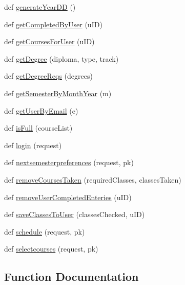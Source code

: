 \begin{DoxyCompactItemize}
def \mbox{\hyperlink{namespacelanding_1_1views_a07d432deb07b33da6ab263caafabb819}{generate\+Year\+DD}} ()
\item 
def \mbox{\hyperlink{namespacelanding_1_1views_ab8699575ba0ef576f40bd71e73a8530f}{get\+Completed\+By\+User}} (u\+ID)
\item 
def \mbox{\hyperlink{namespacelanding_1_1views_a35d744b4e891af5594e09cc3d0ed42bf}{get\+Courses\+For\+User}} (u\+ID)
\item 
def \mbox{\hyperlink{namespacelanding_1_1views_a58f59d9cfdce67b9f2c7f59d99e39e4e}{get\+Degree}} (diploma, type, track)
\item 
def \mbox{\hyperlink{namespacelanding_1_1views_adf4b5d99c41ac39f87a359bdd86b2b02}{get\+Degree\+Reqs}} (degrees)
\item 
def \mbox{\hyperlink{namespacelanding_1_1views_a205b22bd62d9457694957d93b53f35af}{get\+Semester\+By\+Month\+Year}} (m)
\item 
def \mbox{\hyperlink{namespacelanding_1_1views_a8d5dc6aa494a2a455d00898fe7c1a994}{get\+User\+By\+Email}} (e)
\item 
def \mbox{\hyperlink{namespacelanding_1_1views_a0c2f89f5183919eb35499eea63f159a1}{is\+Full}} (course\+List)
\item 
def \mbox{\hyperlink{namespacelanding_1_1views_a7b08070340297551acfaafde9d9376bb}{login}} (request)
\item 
def \mbox{\hyperlink{namespacelanding_1_1views_ae0ecf1d0ea604a47a4617911d02051aa}{nextsemesterpreferences}} (request, pk)
\item 
def \mbox{\hyperlink{namespacelanding_1_1views_a0c09aa6ffb498dba6bae2f61fac3a37d}{remove\+Courses\+Taken}} (required\+Classes, classes\+Taken)
\item 
def \mbox{\hyperlink{namespacelanding_1_1views_a15788f148f992f964f914e41cca3563a}{remove\+User\+Completed\+Enteries}} (u\+ID)
\item 
def \mbox{\hyperlink{namespacelanding_1_1views_a474931c0129efca17c6aa8ba314af9e5}{save\+Classes\+To\+User}} (classes\+Checked, u\+ID)
\item 
def \mbox{\hyperlink{namespacelanding_1_1views_acbb94e571697e7b28ad35bf2996fe01f}{schedule}} (request, pk)
\item 
def \mbox{\hyperlink{namespacelanding_1_1views_a36b36778d06e5903c4854cb15d5ac297}{selectcourses}} (request, pk)
\end{DoxyCompactItemize}


\subsection{Function Documentation}
\mbox{\label{namespacelanding_1_1views_adba23e76d333670361090c476505a965}} 
